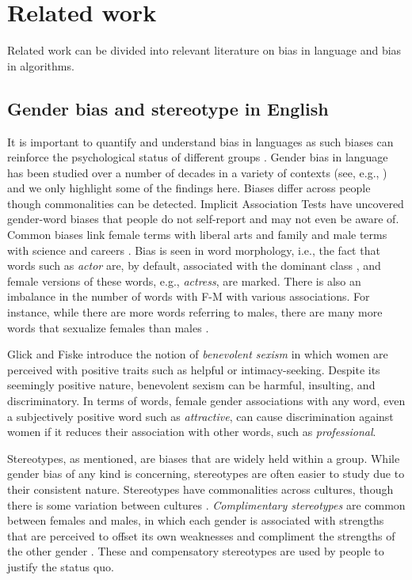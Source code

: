 \documentclass{article}
\begin{document}
\section{Related work}
Related work can be divided into relevant literature on bias in language and bias in algorithms. 

\subsection{Gender bias and stereotype in English}
It is important to quantify and understand bias in languages as such biases can reinforce the psychological status of different groups \cite{sapir1985selected}.
Gender bias in language has been studied over a number of decades in a variety of contexts (see, e.g., \cite{holmes2008handbook}) and we only highlight some of the findings here. Biases differ across people though commonalities can be detected. Implicit Association Tests \cite{greenwald1998measuring} have uncovered gender-word biases that people do not self-report and may not even be aware of. Common biases link female terms with liberal arts and family and male terms with science and careers \cite{nosek2002harvesting}. Bias is seen in word morphology, i.e., the fact that words such as {\em actor} are, by default, associated with the dominant class \cite{jakobson1990language}, and female versions of these words, e.g., {\em actress}, are marked. There is also an imbalance in the number of words with F-M with various associations. For instance, while there are more words referring to males, there are many more words that sexualize females than males \cite{stanley1977paradigmatic}. 

Glick and Fiske \cite{glick1996ambivalent} introduce the notion of {\em benevolent sexism} in which women are perceived with positive traits such as helpful or intimacy-seeking. Despite its seemingly positive nature, benevolent sexism can be harmful, insulting, and discriminatory. In terms of words, female gender associations with any word, even a subjectively positive word such as {\em attractive}, can cause discrimination against women if it reduces their association with other words, such as {\em professional}.  

Stereotypes, as mentioned, are biases that are widely held within a group. While gender bias of any kind is concerning, stereotypes are often easier to study due to their consistent nature. Stereotypes have commonalities across cultures, though there is some variation between cultures \cite{cuddy2015men}.  {\em Complimentary stereotypes} are common between females and males, in which each gender is associated with strengths that are perceived to offset its own weaknesses and compliment the strengths of the other gender \cite{jost2005exposure}. These and compensatory stereotypes are used by people to justify the status quo.
\end{document}

